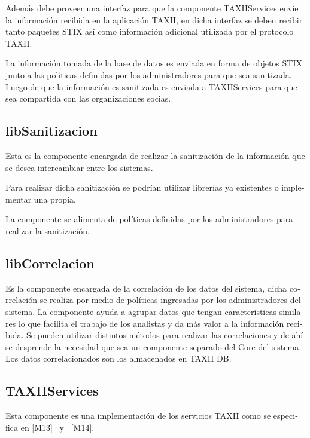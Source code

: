 	\foreignlanguage{spanish}{Además debe proveer una interfaz para que la componente TAXIIServices envíe la información
		recibida en la aplicación TAXII, en dicha interfaz se deben recibir tanto paquetes STIX así como información adicional
		utilizada por el protocolo TAXII. }
	
	\foreignlanguage{spanish}{La información tomada de la base de datos es enviada en forma de objetos STIX junto a las
		políticas definidas por los administradores para que sea sanitizada. Luego de que la información es sanitizada es
		enviada a TAXIIServices para que sea compartida con las organizaciones socias.}
	
	\subsection[libSanitizacion]{\foreignlanguage{spanish}{libSanitizacion}}
	\foreignlanguage{spanish}{Esta es la componente encargada de realizar la sanitización de la información que se desea
		intercambiar entre los sistemas. }
	
	\foreignlanguage{spanish}{Para realizar dicha sanitización se podrían utilizar librerías ya existentes o implementar una
		propia.}
	
	\foreignlanguage{spanish}{La componente se alimenta de políticas definidas por los administradores para realizar la
		sanitización.}
	
	\subsection[libCorrelacion]{\foreignlanguage{spanish}{libCorrelacion}}
	\foreignlanguage{spanish}{Es la componente encargada de la correlación de los datos del sistema, dicha correlación se
		realiza por medio de políticas ingresadas por los administradores del sistema. La componente ayuda a agrupar datos que
		tengan características similares lo que facilita el trabajo de los analistas y da más valor a la información recibida.
		Se pueden utilizar distintos métodos para realizar las correlaciones y de ahí se desprende la necesidad que sea un
		componente separado del Core del sistema. Los datos correlacionados son los almacenados en TAXII DB.}
	
	\subsection[TAXIIServices]{\foreignlanguage{spanish}{TAXIIServices}}
	\foreignlanguage{spanish}{Esta componente es una implementación de los servicios TAXII como se especifica en [M13] \ y
		\ [M14]. }
	
